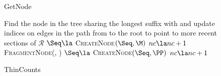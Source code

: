\begin{figure*}[ttt!]
\begin{minipage}[t]{.48\linewidth}
\end{minipage}
	\hfill
%
%
%		
%		
%	
	\begin{minipage}[t]{.48\linewidth}
\begin{algorithm}[H]
	\caption{GetNode} \label{alg:getnode}
	\begin{algorithmic}[1]
		\State Find the node \M \space in the tree sharing the longest suffix with \Seq \space and update indices on edges in the path from \M \space to the root to point to more recent sections of $\mathcal{R}$
				\State $\Seq \la$ \textsc{CreateNode}$(\Seq, \M)$
				\State $nc \la nc + 1$
			\EndIf
		\Else
			\State \PP \la \space \textsc{FragmentNode}(\M, \Seq)
			\State $\Seq \la $ \textsc{CreateNode}$(\Seq, \PP)$
			\State $nc \la nc + 1$
		\EndIf
	\EndFunction
	\end{algorithmic}	
\end{algorithm}
\vspace{-.75cm}
\begin{algorithm}[H]
	\caption{ThinCounts} \label{alg:thincounts}
	\begin{algorithmic}[1]
			

\end{algorithmic}
\end{algorithm}
\end{minipage}
\end{figure*}
